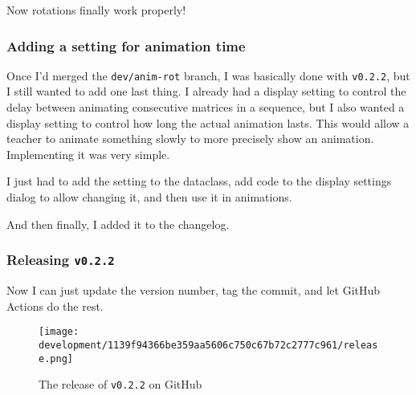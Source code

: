 \documentclass[../development.tex]{subfiles}
\begin{document}

Now rotations finally work properly!

\subsubsection{Adding a setting for animation time\label{development:making-v0.2.2:adding-a-setting-for-animation-time}}

Once I'd merged the \texttt{dev/anim-rot} branch, I was basically done with \texttt{v0.2.2}, but I still wanted to add one last thing. I already had a display setting to control the delay between animating consecutive matrices in a sequence, but I also wanted a display setting to control how long the actual animation lasts. This would allow a teacher to animate something slowly to more precisely show an animation. Implementing it was very simple.

I just had to add the setting to the  dataclass, add code to the display settings dialog to allow changing it, and then use it in animations.




And then finally, I added it to the changelog.


\subsubsection{Releasing \texttt{v0.2.2}\label{development:making-v0.2.2:releasing-v0.2.2}}

Now I can just update the version number, tag the commit, and let GitHub Actions do the rest.


\begin{figure}[H]
	\centering
	\texttt{[image: development/1139f94366be359aa5606c750c67b72c2777c961/release.png]}
	\caption{The release of \texttt{v0.2.2} on GitHub}
	\label{fig:development:1139f94366be359aa5606c750c67b72c2777c961:release.png}
\end{figure}
\end{document}
